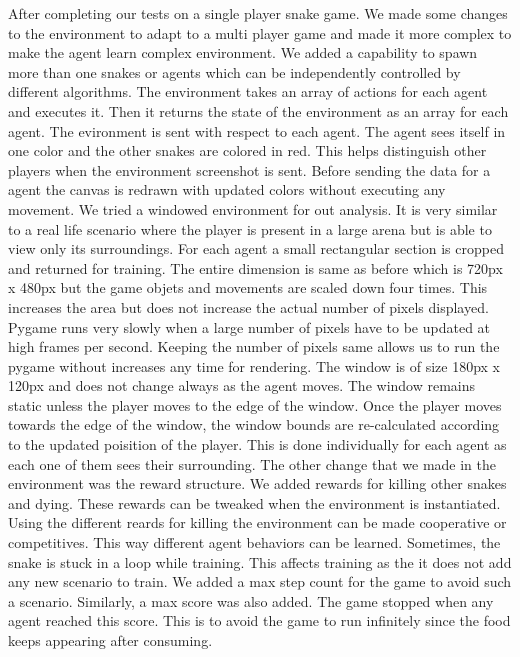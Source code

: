\documentclass[conference,10pt]{IEEEtran}
\begin{document}
	After completing our tests on a single player snake game. We made some changes to the environment to adapt to a multi player game and made it more complex to make the agent learn complex environment.  We added a capability to spawn more than one snakes or agents which can be independently controlled by different algorithms. The environment takes an array of actions for each agent and executes it. Then it returns the state of the environment as an array for each agent. The evironment is sent with respect to each agent. The agent sees itself in one color and the other snakes are colored in red. This helps distinguish other players when the environment screenshot is sent. Before sending the data for a agent the canvas is redrawn with updated colors without executing any movement.
	\break
	\break
	We tried a windowed environment for out analysis. It is very similar to a real life scenario where the player is present in a large arena but is able to view only its surroundings. For each agent a small rectangular section is cropped and returned for training. The entire dimension is same as before which is 720px x 480px but the game objets and movements are scaled down four times. This increases the area but does not increase the actual number of pixels displayed. Pygame runs very slowly when a large number of pixels have to be updated at high frames per second. Keeping the number of pixels same allows us to run the pygame without increases any time for rendering. The window is of size 180px x 120px and does not change always as the agent moves. The window remains static unless the player moves to the edge of the window. Once the player moves towards the edge of the window, the window bounds are re-calculated according to the updated poisition of the player. This is done individually for each agent as each one of them sees their surrounding.
	\break
	\break
	The other change that we made in the environment was the reward structure. We added rewards for killing other snakes and dying. These rewards can be tweaked when the environment is instantiated. Using the different reards for killing the environment can be made cooperative or competitives. This way different agent behaviors can be learned.
	\break
	\break
	Sometimes, the snake is stuck in a loop while training. This affects training as the it does not add any new scenario to train. We added a max step count for the game to avoid such a scenario. Similarly, a max score was also added. The game stopped when any agent reached this score. This is to avoid the game to run infinitely since the food keeps appearing after consuming. 
\end{document}
